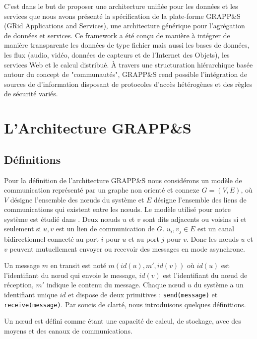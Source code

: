 C'est dans le but de proposer une architecture unifiée pour les données et les services que nous avons présenté la spécification de la plate-forme GRAPP\&S (GRid Applications and Services), une architecture générique pour l'agrégation de données et services. Ce framework a été conçu de manière à intégrer de manière transparente les données de type fichier mais aussi les bases de données, les flux (audio, vidéo, données de capteurs et de l'Internet des Objets), les services Web et le calcul distribué. À travers une structuration hiérarchique basée autour du concept de "communautés", GRAPP\&S rend possible l'intégration de sources de d'information disposant de protocoles d'accès hétérogènes et des règles de sécurité variés.

\section{L'Architecture GRAPP\&S \label{SEC:GRAPPES}}

\subsection{Définitions\label{sec:Definitions}}
Pour la définition de l'architecture GRAPP\&S nous considérons un modèle de communication représenté par un  graphe non orienté  et connexe $G = (V, E)$, où $V$  désigne  l'ensemble  des  n{\oe}uds  du système et $E$ désigne l'ensemble des liens de communications qui existent entre les n{\oe}uds. Le modèle utilisé pour notre système est étudié dans \cite{Chalopin06}. Deux n{\oe}uds $u$ et $v$ sont dits adjacents ou voisins si et seulement si ${u, v}$ est un lien de communication de $G$. ${u_i, v_j} \in E$ est un canal bidirectionnel connecté au port $i$ pour $u$ et au port $j$ pour $v$. Donc les n{\oe}uds $u$ et $v$ peuvent mutuellement envoyer ou recevoir des messages en mode asynchrone. 

Un message $m$ en transit est noté $m(id(u), m', id(v))$ où  $id(u)$  est  l'identifiant du n{\oe}ud qui envoie le message, $id(v)$ est  l'identifiant du n{\oe}ud de réception, $m'$ indique le contenu du message. Chaque n{\oe}ud $u$ du système a un identifiant unique $id$ et  dispose de deux primitives : \texttt{send(message)} et \texttt{receive(message)}. Par soucis de clarté, nous introduisons quelques définitions.

\begin{definition}Un n{\oe}ud  est  défini  comme  étant une  capacité de calcul, de stockage, avec  des moyens et des canaux de communications.\end{definition}

